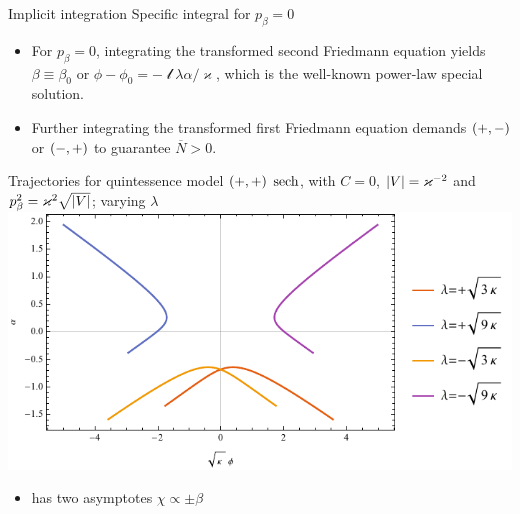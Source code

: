 \documentclass[9pt]{beamer}
\begin{document}
\begin{frame}%
{Implicit integration}%
{Specific integral for $p_\beta = 0$}
\begin{itemize}
\item For $p_\beta = 0$, integrating the transformed second Friedmann 
equation yields $\beta \equiv \beta_0$ or $\phi-\phi_0 =
-\mscrl\lambda\alpha/\varkappa$, which is the well-known power-law special
solution.

\item Further integrating the transformed first Friedmann equation demands 
${\left(+,-\right)}$ or ${\left(-,+\right)}$ to guarantee $\overline{N} > 0$.

\end{itemize}
\end{frame}




\begin{frame}%
{Trajectories for quintessence model ${\left(+,+\right)}$}%
{$\operatorname{sech}$, with $C = 0$, ${\left|V\right|} = \varkappa^{-2}$ and
$p_\beta^2 = \varkappa^2\sqrt{{\left|V\right|}}$; varying $\lambda$}
\includegraphics[width=\textwidth]{./plots.nb/sech_lamb.pdf}
\begin{itemize}
	\item has two asymptotes $\chi \propto \pm \beta$
\end{itemize}
\end{frame}
\end{document}
